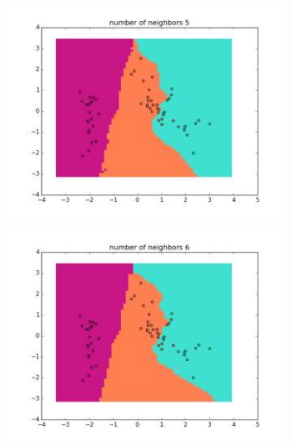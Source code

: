 \documentclass{article}
\begin{document}
\begin{center}
\begin{figure}
\centering
        \begin{subfigure}[b]{0.48\textwidth}
                \centering
                \includegraphics[width=\linewidth]{figure_6}
        \end{subfigure}\hfill
        \begin{subfigure}[b]{0.48\textwidth}
                \centering
                \includegraphics[width=\linewidth]{figure_7}
        \end{subfigure}\hfill
        \label{fig:4}
 \end{figure}
       

\end{center}
\end{document}

